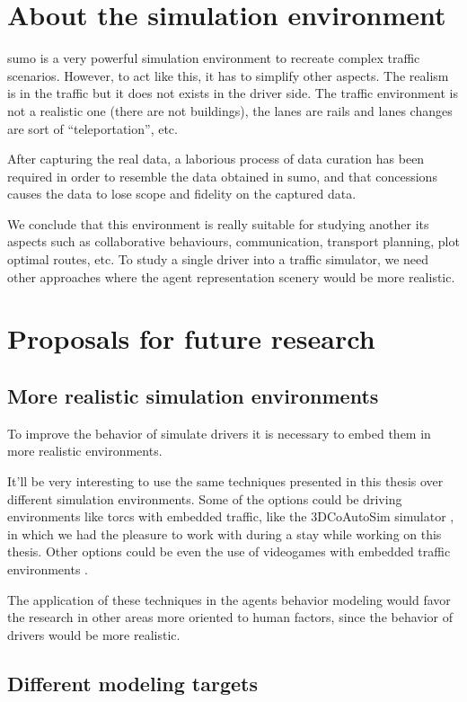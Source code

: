 \section{About the simulation environment}

\gls{sumo} is a very powerful simulation environment to recreate complex traffic scenarios. However, to act like this, it has to simplify other aspects. The realism is in the traffic but it does not exists in the driver side. The traffic environment is not a realistic one (there are not buildings), the lanes are rails and lanes changes are sort of \enquote{teleportation}, etc.

After capturing the real data, a laborious process of data curation has been required in order to resemble the data obtained in \gls{sumo}, and that concessions causes the data to lose scope and fidelity on the captured data.

We conclude that this environment is really suitable for studying another \acrshort{its} aspects such as collaborative behaviours, communication, transport planning, plot optimal routes, etc. To study a single driver into a traffic simulator, we need other approaches where the agent representation scenery would be more realistic.

\section{Proposals for future research}

\subsection{More realistic simulation environments}

To improve the behavior of simulate drivers it is necessary to embed them in more realistic environments.

It'll be very interesting to use the same techniques presented in this thesis over different simulation environments. Some of the options could be driving environments like \ac{torcs} with embedded traffic, like the 3DCoAutoSim simulator \cite{olaverri2018implementation}, in which we had the pleasure to work with during a stay while working on this thesis. Other options could be even the use of videogames with embedded traffic environments \cite{richter2016playing, johnson2017driving}.

The application of these techniques in the agents behavior modeling would favor the research in other areas more oriented to human factors, since the behavior of drivers would be more realistic.

\subsection{Different modeling targets}


\subsection{}

